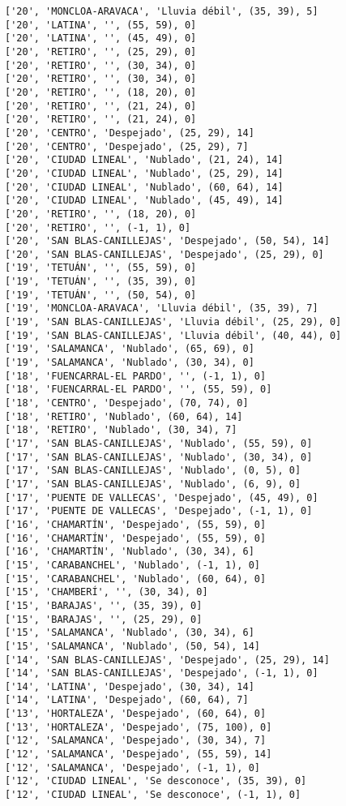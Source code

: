 \documentclass[11pt]{article}
\begin{document}
\begin{Verbatim}[commandchars=\\\{\}]
['20', 'MONCLOA-ARAVACA', 'Lluvia débil', (35, 39), 5]
['20', 'LATINA', '', (55, 59), 0]
['20', 'LATINA', '', (45, 49), 0]
['20', 'RETIRO', '', (25, 29), 0]
['20', 'RETIRO', '', (30, 34), 0]
['20', 'RETIRO', '', (30, 34), 0]
['20', 'RETIRO', '', (18, 20), 0]
['20', 'RETIRO', '', (21, 24), 0]
['20', 'RETIRO', '', (21, 24), 0]
['20', 'CENTRO', 'Despejado', (25, 29), 14]
['20', 'CENTRO', 'Despejado', (25, 29), 7]
['20', 'CIUDAD LINEAL', 'Nublado', (21, 24), 14]
['20', 'CIUDAD LINEAL', 'Nublado', (25, 29), 14]
['20', 'CIUDAD LINEAL', 'Nublado', (60, 64), 14]
['20', 'CIUDAD LINEAL', 'Nublado', (45, 49), 14]
['20', 'RETIRO', '', (18, 20), 0]
['20', 'RETIRO', '', (-1, 1), 0]
['20', 'SAN BLAS-CANILLEJAS', 'Despejado', (50, 54), 14]
['20', 'SAN BLAS-CANILLEJAS', 'Despejado', (25, 29), 0]
['19', 'TETUÁN', '', (55, 59), 0]
['19', 'TETUÁN', '', (35, 39), 0]
['19', 'TETUÁN', '', (50, 54), 0]
['19', 'MONCLOA-ARAVACA', 'Lluvia débil', (35, 39), 7]
['19', 'SAN BLAS-CANILLEJAS', 'Lluvia débil', (25, 29), 0]
['19', 'SAN BLAS-CANILLEJAS', 'Lluvia débil', (40, 44), 0]
['19', 'SALAMANCA', 'Nublado', (65, 69), 0]
['19', 'SALAMANCA', 'Nublado', (30, 34), 0]
['18', 'FUENCARRAL-EL PARDO', '', (-1, 1), 0]
['18', 'FUENCARRAL-EL PARDO', '', (55, 59), 0]
['18', 'CENTRO', 'Despejado', (70, 74), 0]
['18', 'RETIRO', 'Nublado', (60, 64), 14]
['18', 'RETIRO', 'Nublado', (30, 34), 7]
['17', 'SAN BLAS-CANILLEJAS', 'Nublado', (55, 59), 0]
['17', 'SAN BLAS-CANILLEJAS', 'Nublado', (30, 34), 0]
['17', 'SAN BLAS-CANILLEJAS', 'Nublado', (0, 5), 0]
['17', 'SAN BLAS-CANILLEJAS', 'Nublado', (6, 9), 0]
['17', 'PUENTE DE VALLECAS', 'Despejado', (45, 49), 0]
['17', 'PUENTE DE VALLECAS', 'Despejado', (-1, 1), 0]
['16', 'CHAMARTÍN', 'Despejado', (55, 59), 0]
['16', 'CHAMARTÍN', 'Despejado', (55, 59), 0]
['16', 'CHAMARTÍN', 'Nublado', (30, 34), 6]
['15', 'CARABANCHEL', 'Nublado', (-1, 1), 0]
['15', 'CARABANCHEL', 'Nublado', (60, 64), 0]
['15', 'CHAMBERÍ', '', (30, 34), 0]
['15', 'BARAJAS', '', (35, 39), 0]
['15', 'BARAJAS', '', (25, 29), 0]
['15', 'SALAMANCA', 'Nublado', (30, 34), 6]
['15', 'SALAMANCA', 'Nublado', (50, 54), 14]
['14', 'SAN BLAS-CANILLEJAS', 'Despejado', (25, 29), 14]
['14', 'SAN BLAS-CANILLEJAS', 'Despejado', (-1, 1), 0]
['14', 'LATINA', 'Despejado', (30, 34), 14]
['14', 'LATINA', 'Despejado', (60, 64), 7]
['13', 'HORTALEZA', 'Despejado', (60, 64), 0]
['13', 'HORTALEZA', 'Despejado', (75, 100), 0]
['12', 'SALAMANCA', 'Despejado', (30, 34), 7]
['12', 'SALAMANCA', 'Despejado', (55, 59), 14]
['12', 'SALAMANCA', 'Despejado', (-1, 1), 0]
['12', 'CIUDAD LINEAL', 'Se desconoce', (35, 39), 0]
['12', 'CIUDAD LINEAL', 'Se desconoce', (-1, 1), 0]

\end{Verbatim}
\end{document}
